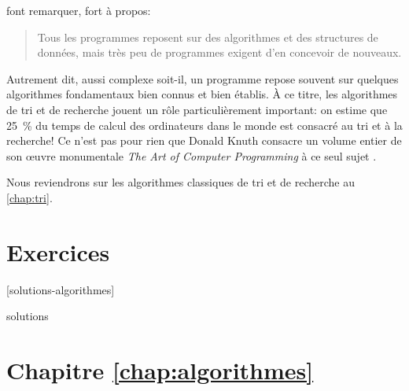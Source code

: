 \citet{Kernighan:practice:1999} font remarquer, fort à propos:
\begin{quote}
  Tous les programmes reposent sur des algorithmes et des structures
  de données, mais très peu de programmes exigent d'en concevoir de
  nouveaux.
\end{quote}
Autrement dit, aussi complexe soit-il, un programme repose souvent sur
quelques algorithmes fondamentaux bien connus et bien établis. À ce
titre, les algorithmes de tri et de recherche jouent un rôle
particulièrement important: on estime que 25~\% du temps de calcul des
ordinateurs dans le monde est consacré au tri et à la recherche! Ce
n'est pas pour rien que Donald Knuth consacre un volume entier de son
œuvre monumentale \emph{The Art of Computer Programming} à ce seul
sujet \citep{Knuth:ACP:vol3:1997}.

Nous reviendrons sur les algorithmes classiques de tri et de recherche
au \autoref{chap:tri}.


\section{Exercices}
\label{sec:algorithmes:exercices}

[solutions-algorithmes]

\begin{Filesave}{solutions}
\section*{Chapitre \ref*{chap:algorithmes}}

\begingroup

\end{Filesave}

